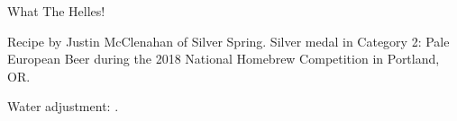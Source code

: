 \begin{recipe}{What The Helles!}

\begin{aboutblock}
Recipe by Justin McClenahan of Silver Spring. Silver medal in Category 2: Pale
European Beer during the 2018 National Homebrew Competition in Portland, OR.
\sourceaha
\end{aboutblock}


\begin{methodandtiming}

\begin{mashsteps}
\end{mashsteps}

\begin{fermentationsteps}
\end{fermentationsteps}

\begin{directions}
Water adjustment: .
\end{directions}

\end{methodandtiming}

\recipebreak

\begin{ingredientsblock}

\begin{malts}
\end{malts}

\begin{hops}
\end{hops}


\end{ingredientsblock}

\end{recipe}
